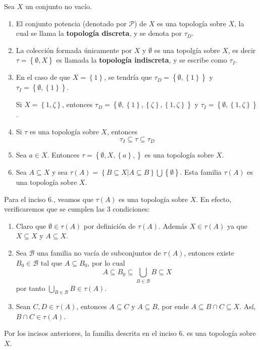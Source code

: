 \documentclass[12pt]{report}
\theoremstyle{largebreak}
\begin{document}
    \begin{exa}
        Sea $X$ un conjunto no vacío.
        \begin{enumerate}
            \item El conjunto potencia (denotado por $\mathcal{P}$) de $X$ es una topología sobre $X$, la cual se llama la \textbf{topología discreta}, y se denota por $\tau_D$.
            \item La colección formada únicamente por $X$ y $\emptyset$ es una topolgía sobre $X$, es decir $\tau=\left\{\emptyset,X \right\}$ es llamada la \textbf{topología indiscreta}, y se escribe como $\tau_I$.
            \item En el caso de que $X=\left\{1\right\}$, se tendría que $\tau_D=\left\{\emptyset,\left\{1\right\} \right\}$ y $\tau_I=\left\{\emptyset,\left\{1\right\} \right\}$.
            
            Si $X=\left\{1,\zeta\right\}$, entonces $\tau_D=\left\{\emptyset,\left\{1\right\},\left\{\zeta\right\},\left\{1,\zeta\right\} \right\}$ y $\tau_I=\left\{\emptyset,\left\{1,\zeta\right\} \right\}$.

            \item Si $\tau$ es una topología sobre $X$, entonces
            \begin{equation*}
                \tau_I\subseteq\tau\subseteq\tau_D
            \end{equation*}
            \item Sea $a\in X$. Entonces $\tau=\left\{\emptyset,X,\left\{a\right\},\right\}$ es una topología sobre $X$.
            \item Sea $A\subseteq X$ y sea $\tau\left(A\right)=\left\{B\subseteq X\big| A\subseteq B \right\}\bigcup\left\{\emptyset\right\}$. Esta familia $\tau\left(A\right)$ es una topología sobre $X$.
        \end{enumerate} 
    \end{exa}

    \begin{sol}
        Para el inciso 6., veamos que $\tau(A)$ es una topología sobre $X$. En efecto, verificaremos que se cumplen las 3 condiciones:
        \begin{enumerate}
            \item Claro que $\emptyset\in\tau(A)$ por definición de $\tau(A)$. Además $X\in\tau(A)$ ya que $X\subseteq X$ y $A\subseteq X$.
            \item Sea $\mathcal{B}$ una familia no vacía de subconjuntos de $\tau(A)$, entonces existe $B_0\in\mathcal{B}$ tal que $A\subseteq B_0$, por lo cual
            \begin{equation*}
                A\subseteq B_0\subseteq\bigcup_{B\in\mathcal{B}}B\subseteq X
            \end{equation*}
            por tanto $\bigcup_{B\in\mathcal{B}}B\in\tau(A)$.
            \item Sean $C,D\in\tau(A)$, entonces $A\subseteq C$ y $A\subseteq B$, por ende $A\subseteq B\cap C\subseteq X$. Así, $B\cap C\in\tau(A)$.
        \end{enumerate}
        Por los incisos anteriores, la familia descrita en el inciso 6. es una topología sobre $X$.
    \end{sol}
\end{document}

